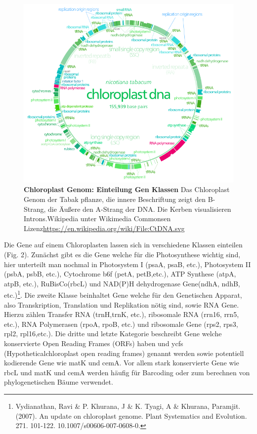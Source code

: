 \documentclass{scrartcl}
\begin{document}
\begin{figure}
\includegraphics[width=.9\linewidth]{./703px-CtDNA.png}
\caption[Chloroplast Genom: Gen Klassen]{\textbf{Chloroplast Genom: Einteilung Gen Klassen} Das Chloroplast Genom der Tabak pflanze, die innere Beschriftung zeigt den B-Strang, die Äußere den A-Strang der DNA. Die Kerben visualisieren Introns.Wikipedia unter Wikimedia Commonsen Lizenz\url{https://en.wikipedia.org/wiki/File:CtDNA.svg}}
\end{figure}
Die Gene auf einem Chloroplasten lassen sich in verschiedene Klassen einteilen (Fig. 2). Zunächst gibt es die Gene welche für die Photosynthese wichtig sind,
hier unterteilt man nochmal in Photosystem I (psaA, psaB, etc.), Photosystem II (psbA, psbB, etc.), Cytochrome b6f (petA, petB,etc.), 
ATP Synthese (atpA, atpB, etc.), RuBisCo(rbcL) und NAD(P)H dehydrogenase Gene(ndhA, ndhB, etc.)\footnote{Vydianathan, Ravi \& P. Khurana, J \& K. Tyagi, A \& Khurana, Paramjit. (2007). An update on chloroplast genome. Plant Systematics and Evolution. 271. 101-122. 10.1007/s00606-007-0608-0.}. Die zweite Klasse beinhaltet Gene welche für den
Genetischen Apparat, also Transkription, Translation und Replikation nötig sind, sowie RNA Gene. Hierzu zählen Transfer RNA (trnH,trnK, etc.), ribosomale RNA (rrn16, rrn5, etc.), 
RNA Polymerasen (rpoA, rpoB, etc.) und ribosomale Gene (rps2, rps3, rpl2, rpl16,etc.). Die dritte und letzte Kategorie beschreibt Gene welche konservierte Open Reading Frames (ORFs) haben und
ycfs (Hypotheticalchloroplast open reading frames) genannt werden sowie potentiell kodierende Gene wie matK und cemA\footnotemark[12]{}. Vor allem stark konservierte Gene wie rbcL und matK und cemA werden 
häufig für Barcoding oder zum berechnen von phylogenetischen Bäume verwendet.
\end{document}
